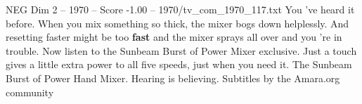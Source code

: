 \begin{textsample}{NEG Dim 2 – 1970 – Score -1.00 – 1970/tv\_com\_1970\_117.txt}  \label{ex:f2_neg_046}
You 've heard it before.
When you mix something so thick, the mixer bogs down helplessly.
And resetting faster might be too \textbf{fast} and the mixer sprays all over and you 're in trouble.
Now listen to the Sunbeam Burst of Power Mixer exclusive.
Just a touch gives a little extra power to all five speeds, just when you need it.
The Sunbeam Burst of Power Hand Mixer.
Hearing is believing.
Subtitles by the Amara.org community

\end{textsample}
